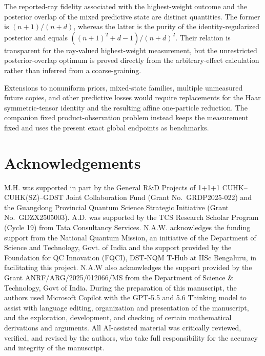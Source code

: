 \documentclass[journal]{IEEEtran}
\begin{document}
The reported-ray fidelity associated with the highest-weight outcome and the
posterior overlap of the mixed predictive state are distinct quantities.  The
former is \((n+1)/(n+d)\), whereas the latter is the purity of the
identity-regularized posterior and equals
\(((n+1)^2+d-1)/(n+d)^2\).  Their relation is transparent for the ray-valued
highest-weight measurement, but the unrestricted posterior-overlap optimum is
proved directly from the arbitrary-effect calculation rather than inferred
from a coarse-graining.

Extensions to nonuniform priors, mixed-state families, multiple unmeasured
future copies, and other predictive losses would require replacements for the
Haar symmetric-tensor identity and the resulting affine one-particle
reduction.  The companion fixed product-observation problem instead keeps the
measurement fixed and uses the present exact global endpoints as benchmarks.

\section*{Acknowledgements} 
%
M.H. was supported in part by the General R\&D Projects of 1+1+1
CUHK--CUHK(SZ)--GDST Joint Collaboration Fund (Grant No.~GRDP2025-022) and the
Guangdong Provincial Quantum Science Strategic Initiative (Grant
No.~GDZX2505003).
%
A.D. was supported by the TCS Research Scholar Program (Cycle 19) from Tata Consultancy Services. N.A.W. acknowledges the funding support from the National Quantum Mission, an initiative of the Department of Science and Technology, Govt. of India and the support provided by the Foundation for QC Innovation (FQCI), DST-NQM T-Hub at IISc Bengaluru, in facilitating this project. N.A.W also acknowledges the support provided by the Grant  ANRF/ARG/2025/012066/MS from the Department of Science \& Technology, Govt of India. 
%
During the preparation of this manuscript, the authors used Microsoft Copilot with the GPT-5.5 and 5.6 Thinking model to assist with language editing, organization and presentation of the manuscript, and the exploration, development, and checking of certain mathematical derivations and arguments. 
All AI-assisted material was critically reviewed, verified, and revised by the authors, who take full responsibility for the accuracy and integrity of the manuscript.
\end{document}
